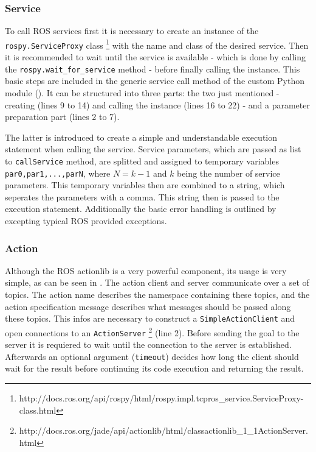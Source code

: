 \begin{figure}[htbp]
	
\end{figure}

\subsubsection{Service}
To call ROS services first it is necessary to create an instance of the \lstinline!rospy.ServiceProxy! class \footnote{http://docs.ros.org/api/rospy/html/rospy.impl.tcpros_service.ServiceProxy-class.html} with the name and class of the desired service. Then it is recommended to wait until the service is available - which is done by calling the \lstinline!rospy.wait_for_service! method - before finally calling the instance. This basic steps are included in the generic service call method of the custom Python module (). It can be structured into three parts: the two just mentioned - creating (lines 9 to 14) and calling the instance (lines 16 to 22) - and a parameter preparation part (lines 2 to 7).

The latter is introduced to create a simple and understandable execution statement when calling the service. Service parameters, which are passed as list to \lstinline!callService! method, are splitted and assigned to temporary variables \lstinline!par0,par1,...,parN!, where $N=k-1$ and $k$ being the number of service parameters. This temporary variables then are combined to a string, which seperates the parameters with a comma. This string then is passed to the execution statement. Additionally the basic error handling is outlined by excepting typical ROS provided exceptions.

\begin{figure}[ht]
	
\end{figure}

\subsubsection{Action}
Although the ROS actionlib is a very powerful component, its usage is very simple, as can be seen in . The action client and server communicate over a set of topics. The action name describes the namespace containing these topics, and the action specification message describes what messages should be passed along these topics. This infos are necessary to construct a \lstinline!SimpleActionClient! and open connections to an \lstinline!ActionServer! \footnote{http://docs.ros.org/jade/api/actionlib/html/classactionlib_1_1ActionServer.html} (line 2). Before sending the goal to the server it is requiered to wait until the connection to the server is established. Afterwards an optional argument (\lstinline!timeout!) decides how long the client should wait for the result before continuing its code execution and returning the result.


